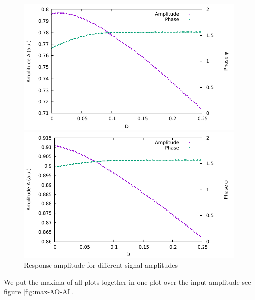 \documentclass[10pt,fleqn,%
reqno,a4paper]{article}
\begin{document}
\begin{figure}[htpb]
	\begin{minipage}[b]{0.5\linewidth}
	\includegraphics[width=\linewidth]{gnuplot_pictures/final_pictures/ampl_1p0_phase.pdf} 
	\end{minipage} 
	\begin{minipage}[b]{0.5\linewidth}
	\includegraphics[width=\linewidth]{gnuplot_pictures/final_pictures/ampl_2p0_phase.pdf} 
	\end{minipage} 
\caption{Response amplitude for different signal amplitudes}
\label{fig:var_amp}
\end{figure}
\newpage
We put the maxima of all plots together in one plot over the input amplitude see figure \ref{fig:max-AO-AI}.
\end{document}
